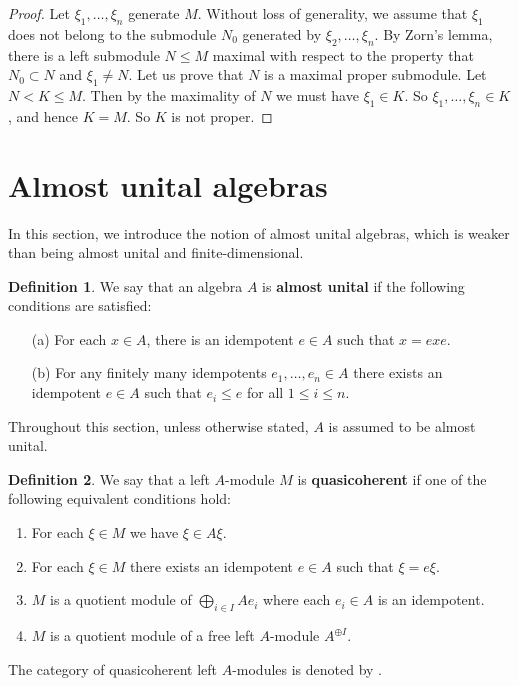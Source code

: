 \documentclass[11pt,b5paper,notitlepage]{article}
\theoremstyle{definition}
\newtheorem{df}{Definition}[section]
\theoremstyle{plain}
\newcommand{\QC}{\mathrm{QCoh}_{\mathrm L}}
\newcommand{\Coh}{\mathrm{Coh}_{\mathrm L}}
\numberwithin{equation}{section}
\begin{document}

\begin{proof}
Let $\xi_1,\dots,\xi_n$ generate $M$. Without loss of generality, we assume that $\xi_1$ does not belong to the submodule $N_0$ generated by $\xi_2,\dots,\xi_n$. By Zorn's lemma, there is a left submodule $N\leq M$ maximal with respect to the property that $N_0\subset N$ and $\xi_1\neq N$. Let us prove that $N$ is a maximal proper submodule. Let $N<K\leq M$. Then by the maximality of $N$ we must have $\xi_1\in K$. So $\xi_1,\dots,\xi_n\in K$, and hence $K=M$. So $K$ is not proper.
\end{proof}








\section{Almost unital algebras}


In this section, we introduce the notion of almost unital algebras, which is weaker than being almost unital and finite-dimensional.


\begin{df}
We say that an algebra $A$ is \textbf{almost unital} if the following conditions are satisfied:
\begin{itemize}
\item[(a)] For each $x\in A$, there is an idempotent $e\in A$ such that $x=exe$.
\item[(b)] For any finitely many idempotents $e_1,\dots,e_n\in A$ there exists an idempotent $e\in A$ such that $e_i\leq e$ for all $1\leq i\leq n$.
\end{itemize}
\end{df}


Throughout this section, unless otherwise stated, $A$ is assumed to be almost unital.

\begin{df}\label{lb18}
We say that a left $A$-module $M$ is \textbf{quasicoherent} if one of the following equivalent conditions hold:
\begin{enumerate}[label=(\arabic*)]
\item For each $\xi\in M$ we have $\xi\in A\xi$.
\item For each $\xi\in M$ there exists an idempotent $e\in A$ such that $\xi=e\xi$.
\item $M$ is a quotient module of $\bigoplus_{i\in I}Ae_i$ where each $e_i\in A$ is an idempotent.
\item $M$ is a quotient module of a free left $A$-module $A^{\oplus I}$.
\end{enumerate}
The category of quasicoherent left $A$-modules is denoted by \pmb{$\QC(A)$}.
\end{df}
\end{document}
